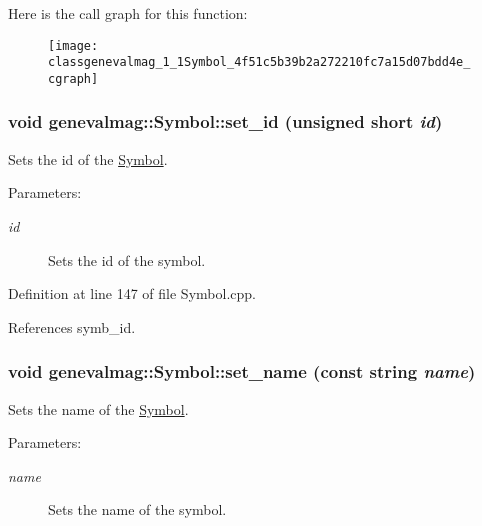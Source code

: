 Here is the call graph for this function:\nopagebreak
\begin{figure}[H]
\begin{center}
\leavevmode
\texttt{[image: classgenevalmag\_1\_1Symbol\_4f51c5b39b2a272210fc7a15d07bdd4e\_cgraph]}
\end{center}
\end{figure}
\hypertarget{classgenevalmag_1_1Symbol_997ca15803cde32380834a029d3609a7}{
\subsubsection[{set\_\-id}]{\setlength{\rightskip}{0pt plus 5cm}void genevalmag::Symbol::set\_\-id (unsigned short {\em id})}}
\label{classgenevalmag_1_1Symbol_997ca15803cde32380834a029d3609a7}


Sets the id of the \hyperlink{classgenevalmag_1_1Symbol}{Symbol}. \begin{Desc}
\item[Parameters:]
\begin{description}
\item[{\em id}]Sets the id of the symbol. \end{description}
\end{Desc}


Definition at line 147 of file Symbol.cpp.

References symb\_\-id.\hypertarget{classgenevalmag_1_1Symbol_257b4ff2e26d8c15d33e9ac6194f44fb}{
\subsubsection[{set\_\-name}]{\setlength{\rightskip}{0pt plus 5cm}void genevalmag::Symbol::set\_\-name (const string {\em name})}}
\label{classgenevalmag_1_1Symbol_257b4ff2e26d8c15d33e9ac6194f44fb}


Sets the name of the \hyperlink{classgenevalmag_1_1Symbol}{Symbol}. \begin{Desc}
\item[Parameters:]
\begin{description}
\item[{\em name}]Sets the name of the symbol. \end{description}
\end{Desc}


